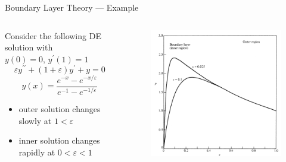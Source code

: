 \documentclass[compress]{beamer}
\begin{document}
\begin{frame}{Boundary Layer Theory --- Example \cite{benderorszag}}
    \begin{columns}
       \begin{column}{0.6\textwidth}
            Consider the following DE solution with $y(0)=0,\, y^\prime (1)=1$
            \begin{equation}
                \varepsilon y^{\prime\prime}+\left( 1+\varepsilon \right) y^\prime+y=0
            \end{equation} 
            \begin{equation}
                y(x)=\frac{e^{-x}-e^{-x / \varepsilon}}{e^{-1}-e^{-1 / \varepsilon}}
            \end{equation} 
            \begin{itemize}
                \item outer solution changes slowly at $1<\varepsilon$
                \item inner solution changes rapidly at  $0<\varepsilon<1$
            \end{itemize}
       \end{column} 
       \begin{column}{0.4\textwidth}
            \begin{figure}[htpb]
                \centering
                \includegraphics[scale=0.25]{media/inner-outer-solution.png}
            \end{figure}
       \end{column} 
    \end{columns}
\end{frame}
\end{document}
